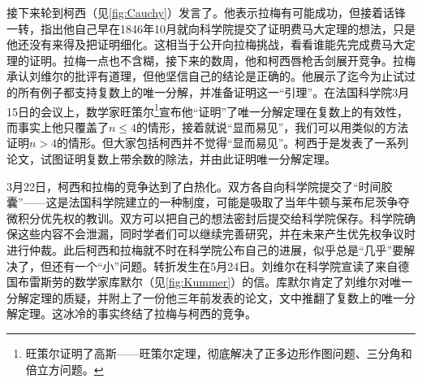 \documentclass[b5paper]{ctexart}
\begin{document}
接下来轮到柯西（见\cref{fig:Cauchy}）发言了。他表示拉梅有可能成功，但接着话锋一转，指出他自己早在1846年10月就向科学院提交了证明费马大定理的想法，只是他还没有来得及把证明细化。这相当于公开向拉梅挑战，看看谁能先完成费马大定理的证明。拉梅一点也不含糊，接下来的数周，他和柯西唇枪舌剑展开竞争。拉梅承认刘维尔的批评有道理，但他坚信自己的结论是正确的。他展示了迄今为止试过的所有例子都支持复数上的唯一分解，并准备证明这一“引理”。在法国科学院3月15日的会议上，数学家旺策尔\footnote{旺策尔证明了高斯——旺策尔定理，彻底解决了正多边形作图问题、三分角和倍立方问题。}宣布他“证明”了唯一分解定理在复数上的有效性，而事实上他只覆盖了$n \leq 4$的情形，接着就说“显而易见”，我们可以用类似的方法证明$n > 4$的情形。但大家包括柯西并不觉得“显而易见”。柯西于是发表了一系列论文，试图证明复数上带余数的除法，并由此证明唯一分解定理。

3月22日，柯西和拉梅的竞争达到了白热化。双方各自向科学院提交了“时间胶囊”——这是法国科学院建立的一种制度，可能是吸取了当年牛顿与莱布尼茨争夺微积分优先权的教训。双方可以把自己的想法密封后提交给科学院保存。科学院确保这些内容不会泄漏，同时学者们可以继续完善研究，并在未来产生优先权争议时进行仲裁。此后柯西和拉梅就不时在科学院公布自己的进展，似乎总是“几乎”要解决了，但还有一个“小”问题。转折发生在5月24日。刘维尔在科学院宣读了来自德国布雷斯劳的数学家库默尔（见\cref{fig:Kummer}）的信。库默尔肯定了刘维尔对唯一分解定理的质疑，并附上了一份他三年前发表的论文，文中推翻了复数上的唯一分解定理。这冰冷的事实终结了拉梅与柯西的竞争。
\end{document}

